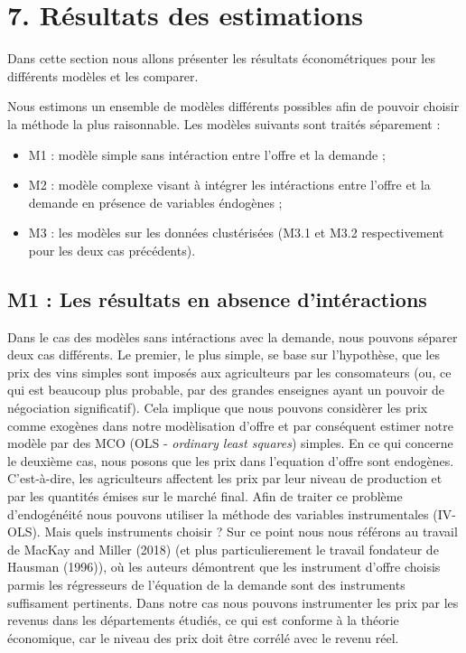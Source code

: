 \documentclass[11pt,]{article}
\providecommand{\tightlist}{%
  \setlength{\itemsep}{0pt}\setlength{\parskip}{0pt}}
\begin{document}
\hypertarget{resultats-des-estimations}{%
\section{7. Résultats des estimations}\label{resultats-des-estimations}}

Dans cette section nous allons présenter les résultats économétriques
pour les différents modèles et les comparer.

Nous estimons un ensemble de modèles différents possibles afin de
pouvoir choisir la méthode la plus raisonnable. Les modèles suivants
sont traités séparement :

\begin{itemize}
\tightlist
\item
  M1 : modèle simple sans intéraction entre l'offre et la demande ;
\item
  M2 : modèle complexe visant à intégrer les intéractions entre l'offre
  et la demande en présence de variables éndogènes ;
\item
  M3 : les modèles sur les données clustérisées (M3.1 et M3.2
  respectivement pour les deux cas précédents).
\end{itemize}

\hypertarget{m1-les-resultats-en-absence-dinteractions}{%
\subsection{M1 : Les résultats en absence
d'intéractions}\label{m1-les-resultats-en-absence-dinteractions}}

Dans le cas des modèles sans intéractions avec la demande, nous pouvons
séparer deux cas différents. Le premier, le plus simple, se base sur
l'hypothèse, que les prix des vins simples sont imposés aux agriculteurs
par les consomateurs (ou, ce qui est beaucoup plus probable, par des
grandes enseignes ayant un pouvoir de négociation significatif). Cela
implique que nous pouvons considèrer les prix comme exogènes dans notre
modèlisation d'offre et par conséquent estimer notre modèle par des MCO
(OLS - \emph{ordinary least squares}) simples. En ce qui concerne le
deuxième cas, nous posons que les prix dans l'equation d'offre sont
endogènes. C'est-à-dire, les agriculteurs affectent les prix par leur
niveau de production et par les quantités émises sur le marché final.
Afin de traiter ce problème d'endogénéité nous pouvons utiliser la
méthode des variables instrumentales (IV-OLS). Mais quels instruments
choisir ? Sur ce point nous nous référons au travail de MacKay and
Miller (2018) (et plus particulierement le travail fondateur de Hausman
(1996)), où les auteurs démontrent que les instrument d'offre choisis
parmis les régresseurs de l'équation de la demande sont des instruments
suffisament pertinents. Dans notre cas nous pouvons instrumenter les
prix par les revenus dans les départements étudiés, ce qui est conforme
à la théorie économique, car le niveau des prix doit être corrélé avec
le revenu réel.
\end{document}
